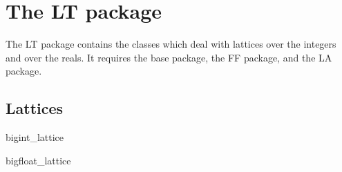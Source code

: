 %
%
%
%

\part*{The \LiDIA LT package}\label{LiDIA-LT}

The \LiDIA LT package contains the classes which deal with lattices over the integers and over
the reals.  It requires the \LiDIA base package, the \LiDIA FF package, and the \LiDIA LA
package.

\chapter{Lattices}

\begin{class}{bigint_lattice}
  
\end{class}

\begin{class}{bigfloat_lattice}
  
\end{class}

%

%
